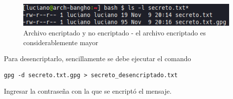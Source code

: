 \begin{figure}[H]
    \centering
    \includegraphics[width=\linewidth]{images/arys-tp3-pgp-simetrico.png}
    \caption*{Archivo encriptado y no encriptado - el archivo encriptado es considerablemente mayor}
\end{figure}

Para desencriptarlo, sencillamente se debe ejecutar el comando

\begin{lstlisting}
gpg -d secreto.txt.gpg > secreto_desencriptado.txt
\end{lstlisting}

Ingresar la contraseña con la que se encriptó el mensaje.




\clearpage
\printbibliography


